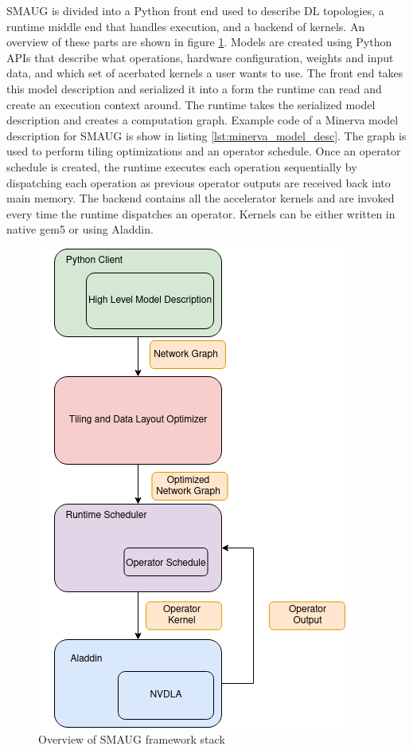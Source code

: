 SMAUG is divided into a Python front end used to describe DL topologies, a
runtime middle end that handles execution, and a backend of kernels. An overview
of these parts are shown in figure \ref{fig:SmaugStack}. Models are
created using Python APIs that describe what operations, hardware
configuration, weights and input data, and which set of acerbated kernels a
user wants to use. The front end takes this model description and serialized it
into a form the runtime can read and create an execution context around. The
runtime takes the serialized model description and creates a computation graph.
Example code of a Minerva model description for SMAUG is show in listing
\ref{lst:minerva_model_desc}. The graph is used to perform tiling
optimizations and an operator schedule. Once an operator schedule is created,
the runtime executes each operation sequentially by dispatching each operation
as previous operator outputs are received back into main memory. The backend
contains all the accelerator kernels and are invoked every time the runtime
dispatches an operator. Kernels can be either written in native gem5 or using
Aladdin.



\begin{figure}[thb!]
\centering
\includegraphics[scale=0.7]{Figures/smaug_stack.png}
\decoRule
\caption[Saved]{Overview of SMAUG framework stack}
\label{fig:SmaugStack}
\end{figure}

